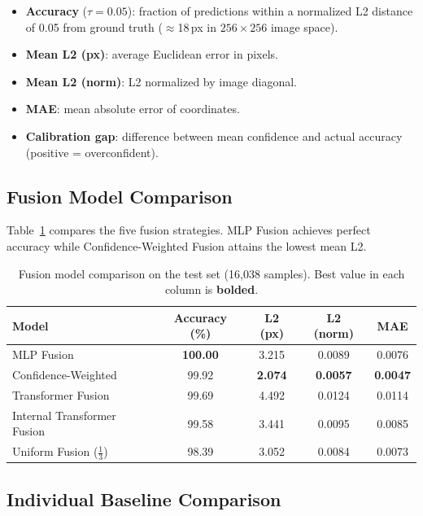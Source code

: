 \documentclass[11pt,a4paper]{article}
\begin{document}
\begin{itemize}[nosep]
    \item \textbf{Accuracy} ($\tau{=}0.05$): fraction of predictions within a
        normalized L2 distance of 0.05 from ground truth ($\approx$18\,px in
        $256{\times}256$ image space).
    \item \textbf{Mean L2 (px)}: average Euclidean error in pixels.
    \item \textbf{Mean L2 (norm)}: L2 normalized by image diagonal.
    \item \textbf{MAE}: mean absolute error of coordinates.
    \item \textbf{Calibration gap}: difference between mean confidence and
        actual accuracy (positive = overconfident).
\end{itemize}

\subsection{Fusion Model Comparison}

Table~\ref{tab:fusion} compares the five fusion strategies.  MLP Fusion achieves
perfect accuracy while Confidence-Weighted Fusion attains the lowest mean L2.

\begin{table}[H]
\centering
\caption{Fusion model comparison on the test set (16{,}038 samples).
         Best value in each column is \textbf{bolded}.}
\label{tab:fusion}
\begin{tabular}{@{}lcccc@{}}
\toprule
\textbf{Model} & \textbf{Accuracy (\%)} & \textbf{L2 (px)} & \textbf{L2 (norm)} & \textbf{MAE} \\
\midrule
MLP Fusion                    & \textbf{100.00} & 3.215 & 0.0089 & 0.0076 \\
Confidence-Weighted           & 99.92  & \textbf{2.074} & \textbf{0.0057} & \textbf{0.0047} \\
Transformer Fusion            & 99.69  & 4.492 & 0.0124 & 0.0114 \\
Internal Transformer Fusion   & 99.58  & 3.441 & 0.0095 & 0.0085 \\
Uniform Fusion ($\tfrac{1}{3}$) & 98.39  & 3.052 & 0.0084 & 0.0073 \\
\bottomrule
\end{tabular}
\end{table}

\subsection{Individual Baseline Comparison}
\end{document}
